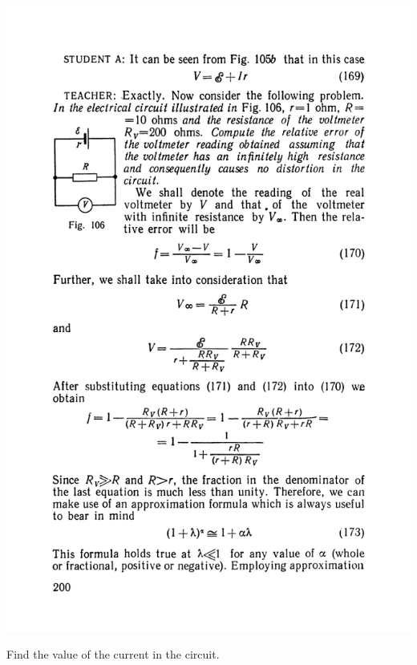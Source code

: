 \documentclass[a4paper,sfsidenotes]{tufte-book}
\begin{document}
\begin{marginfigure}%
\centering
\includegraphics[width=0.7\linewidth]{fig-106a}
\caption{Find the value of the current in the circuit.}
\label{fig-106}
\end{marginfigure}
\end{document}
